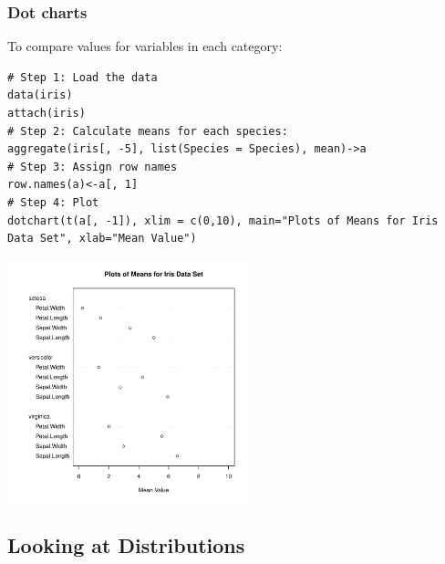\begin{frame}
  \frametitle{Dot charts}

To compare values for variables in each category:

\begin{lstlisting}
# Step 1: Load the data
data(iris)
attach(iris)
# Step 2: Calculate means for each species:
aggregate(iris[, -5], list(Species = Species), mean)->a
# Step 3: Assign row names
row.names(a)<-a[, 1]
# Step 4: Plot
dotchart(t(a[, -1]), xlim = c(0,10), main="Plots of Means for Iris Data Set", xlab="Mean Value")
\end{lstlisting}

\newpage
       \begin{center}
		\includegraphics[width = 70mm]{images/dotPlot.pdf}
	\end{center}

\end{frame}

\subsection{Looking at Distributions}

